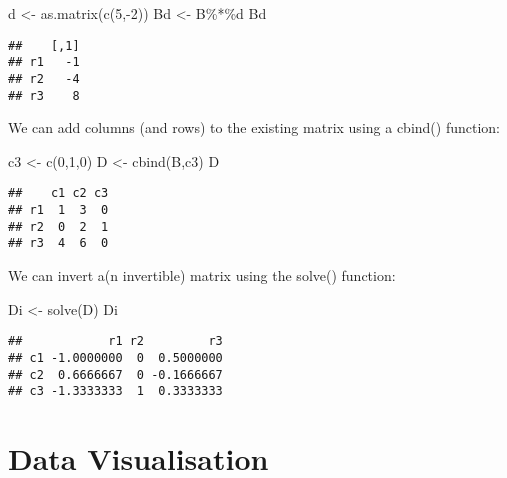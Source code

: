 \documentclass[
  oneside]{book}
\newenvironment{Shaded}{\begin{snugshade}}{\end{snugshade}}
\newcommand{\DecValTok}[1]{\textcolor[rgb]{0.00,0.00,0.81}{#1}}
\newcommand{\FunctionTok}[1]{\textcolor[rgb]{0.00,0.00,0.00}{#1}}
\newcommand{\NormalTok}[1]{#1}
\newcommand{\OtherTok}[1]{\textcolor[rgb]{0.56,0.35,0.01}{#1}}
\newcommand{\SpecialCharTok}[1]{\textcolor[rgb]{0.00,0.00,0.00}{#1}}
\begin{document}
\begin{Shaded}
\begin{Highlighting}[]
\NormalTok{d }\OtherTok{\textless{}{-}} \FunctionTok{as.matrix}\NormalTok{(}\FunctionTok{c}\NormalTok{(}\DecValTok{5}\NormalTok{,}\SpecialCharTok{{-}}\DecValTok{2}\NormalTok{))}
\NormalTok{Bd }\OtherTok{\textless{}{-}}\NormalTok{ B}\SpecialCharTok{\%*\%}\NormalTok{d}
\NormalTok{Bd}
\end{Highlighting}
\end{Shaded}

\begin{verbatim}
##    [,1]
## r1   -1
## r2   -4
## r3    8
\end{verbatim}

We can add columns (and rows) to the existing matrix using a cbind() function:

\begin{Shaded}
\begin{Highlighting}[]
\NormalTok{c3 }\OtherTok{\textless{}{-}} \FunctionTok{c}\NormalTok{(}\DecValTok{0}\NormalTok{,}\DecValTok{1}\NormalTok{,}\DecValTok{0}\NormalTok{)}
\NormalTok{D }\OtherTok{\textless{}{-}} \FunctionTok{cbind}\NormalTok{(B,c3)}
\NormalTok{D}
\end{Highlighting}
\end{Shaded}

\begin{verbatim}
##    c1 c2 c3
## r1  1  3  0
## r2  0  2  1
## r3  4  6  0
\end{verbatim}

We can invert a(n invertible) matrix using the solve() function:

\begin{Shaded}
\begin{Highlighting}[]
\NormalTok{Di }\OtherTok{\textless{}{-}} \FunctionTok{solve}\NormalTok{(D)}
\NormalTok{Di}
\end{Highlighting}
\end{Shaded}

\begin{verbatim}
##            r1 r2         r3
## c1 -1.0000000  0  0.5000000
## c2  0.6666667  0 -0.1666667
## c3 -1.3333333  1  0.3333333
\end{verbatim}

\hypertarget{data-visualisation}{%
\section*{Data Visualisation}\label{data-visualisation}}
\end{document}
